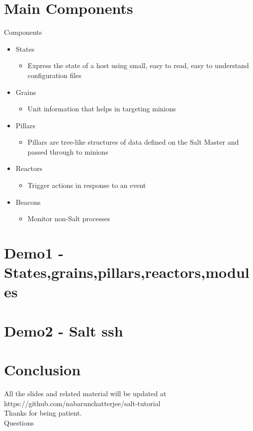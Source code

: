 \documentclass[pdf]{beamer}
\begin{document}
	\section{Main Components}
	\begin{frame}{Components}
		\begin{itemize}
			\item States
			\pause
			\begin{itemize}
				\item Express the state of a host using small, easy to read,
			easy to understand configuration files
			\end{itemize}
			\pause
			\item Grains
			\pause
			\begin{itemize}
				\item Unit information that helps in targeting
					minions
			\end{itemize}
			\pause
			\item Pillars
			\pause
			\begin{itemize}
				\item Pillars are tree-like structures of data
					defined on the Salt Master and passed through to minions
			\end{itemize}
			\pause
			\item Reactors
			\pause
			\begin{itemize}
				\item Trigger actions in response to an event
			\end{itemize}
			\pause
			\item Beacons
			\pause
			\begin{itemize}
				\item Monitor non-Salt processes
			\end{itemize}
		\end{itemize}
	\end{frame}

	\section{Demo1 - States,grains,pillars,reactors,modules}

	\section{Demo2 - Salt ssh}
	
	\section{Conclusion}
	\begin{frame}
		All the slides and related material will be updated at https://github.com/nabarunchatterjee/salt-tutorial\\[12pt]
		Thanks for being patient.\\[12pt]
		Questions
	\end{frame}
\end{document}
